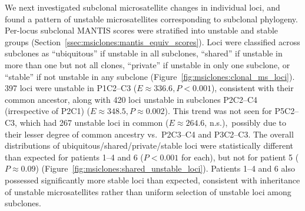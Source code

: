 We next investigated subclonal microsatellite changes in individual loci, and found a pattern of unstable microsatellites corresponding to subclonal phylogeny. Per-locus subclonal MANTIS scores were stratified into unstable and stable groups (Section~\ref{ssec:msiclones:mantis_equiv_scores}). Loci were classified across subclones as ``ubiquitous'' if unstable in all subclones, ``shared'' if unstable in more than one but not all clones, ``private'' if unstable in only one subclone, or ``stable'' if not unstable in any subclone (Figure~\ref{fig:msiclones:clonal_ms_loci}). 397 loci were unstable in P1C2--C3 ($E \approx 336.6, P < 0.001$), consistent with their common ancestor, along with 420 loci unstable in subclones P2C2--C4 (irrespective of P2C1) ($E \approx 348.5, P \approx 0.002$). This trend was not seen for P5C2--C3, which had 267 unstable loci in common ($E \approx 264.6$, n.s.),\ possibly due to their lesser degree of common ancestry vs.\ P2C3--C4 and P3C2--C3. The overall distributions of ubiquitous\slash{}shared\slash{}private\slash{}stable loci were statistically different than expected for patients 1--4 and 6 ($P < 0.001$ for each), but not for patient 5 ($P \approx 0.09$) (Figure~\ref{fig:msiclones:shared_unstable_loci}). Patients 1--4 and 6 also possessed significantly more stable loci than expected, consistent with inheritance of unstable microsatellites rather than uniform selection of unstable loci among subclones.

